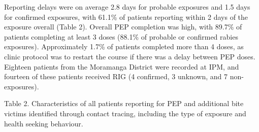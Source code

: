 \documentclass[
]{book}
\begin{document}
Reporting delays were on average 2.8 days for probable exposures and 1.5 days for confirmed exposures, with 61.1\% of patients reporting within 2 days of the exposure overall (Table 2). Overall PEP completion was high, with 89.7\% of patients completing at least 3 doses (88.1\% of probable or confirmed rabies exposures). Approximately 1.7\% of patients completed more than 4 doses, as clinic protocol was to restart the course if there was a delay between PEP doses. Eighteen patients from the Moramanga District were recorded at IPM, and fourteen of these patients received RIG (4 confirmed, 3 unknown, and 7 non-exposures).

Table 2. Characteristics of all patients reporting for PEP and additional bite victims identified through contact tracing, including the type of exposure and health seeking behaviour.
\end{document}
